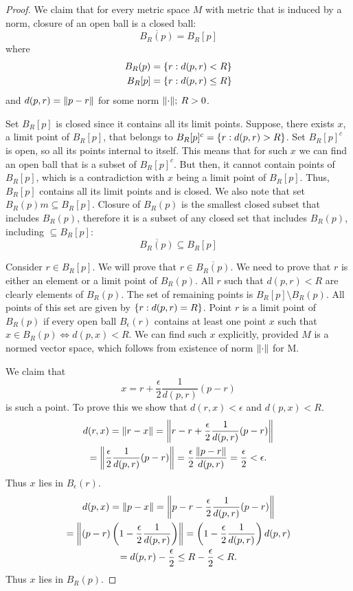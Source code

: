 \documentclass{article}
\DeclarePairedDelimiter{\norm}{\lVert}{\rVert}
\DeclarePairedDelimiter{\set}{ \{ }{ \} }
\begin{document}
\begin{proof}

We claim that for every metric space $M$ with metric that is induced by a norm, closure of an open ball is a closed ball:
\[ \overline{B_R(p)} = B_R[p] \]
where
\begin{align*}
    B_R(p) & = \set{ r : d(p, r) < R } \\
    B_R[p] & = \set{ r : d(p, r) \leq R }     
\end{align*}
and $ d(p, r) = \norm{ p-r }$ for some norm $\norm{ \cdot }; \> R>0 $.

Set $B_R[p]$ is closed since it contains all its limit points.
Suppose, there exists $x$, a limit point of $B_R[p]$, that belongs to $B_R[p]^c = \set{ r: d(p, r) > R}$.
Set $B_R[p]^c$ is open, so all its points internal to itself.
This means that for such $x$ we can find an open ball that is a subset of $B_R[p]^c$.
But then, it cannot contain points of $B_R[p]$, which is a contradiction with $x$ being a limit point of $B_R[p]$.
Thus, $B_R[p]$ contains all its limit points and is closed.
We also note that set $B_R(p)m \subseteq B_R[p]$.
Closure of $B_R(p)$ is the smallest closed subset that includes $B_R(p)$, therefore it is a subset of any closed set that includes $B_R(p)$, including $\subseteq B_R[p]$:
\[ \overline{B_R(p)} \subseteq B_R[p] \]

Consider $r \in B_R[p]$.
We will prove that $r \in \overline{B_R(p)}$.
We need to prove that $r$ is either an element or a limit point of $B_R(p)$.
All $r$ such that $d(p, r) < R$ are clearly elements of $B_R(p)$.
The set of remaining points is $B_R[p] \setminus B_R(p)$.
All points of this set are given by $\set{r: d(p, r) = R }$.
Point $r$ is a limit point of $B_R(p)$ if every open ball $B_\epsilon(r)$ contains at least one point $x$ such that $x \in B_R(p) \iff d(p, x) < R$.
We can find such $x$ explicitly, provided $M$ is a normed vector space, which follows from existence of norm $\norm{ \cdot }$ for M.

We claim that 
\[ x = r + \frac{\epsilon}{2} \frac{1}{d(p, r)}(p-r) \]
is such a point.
To prove this we show that $d(r, x) < \epsilon$ and $d(p, x) < R$.
\begin{multline*}
    d(r, x) = \norm{r-x} 
    = \norm*{ r - r + \frac{\epsilon}{2}\frac{1}{d(p,r)}(p-r) } \\
    =\norm*{ \frac{\epsilon}{2}\frac{1}{d(p,r)}(p-r) }
    = \frac{\epsilon}{2}\frac{\norm{p-r}}{d(p,r)} = \frac{\epsilon}{2} < \epsilon.    
\end{multline*}
Thus $x$ lies in $B_\epsilon(r)$.
\begin{multline*}
    d(p, x) = \norm{p-x} = \norm*{ p - r - \frac{\epsilon}{2}\frac{1}{d(p,r)}(p-r) } \\
    = \norm*{ (p - r)\left(1 - \frac{\epsilon}{2}\frac{1}{d(p,r)}\right) } = \left(1 - \frac{\epsilon}{2}\frac{1}{d(p,r)}\right) d(p, r) \\
    = d(p, r) - \frac{\epsilon}{2} \leq R - \frac{\epsilon}{2} < R.    
\end{multline*}
Thus $x$ lies in $B_R(p)$.


\end{proof}
\end{document}
